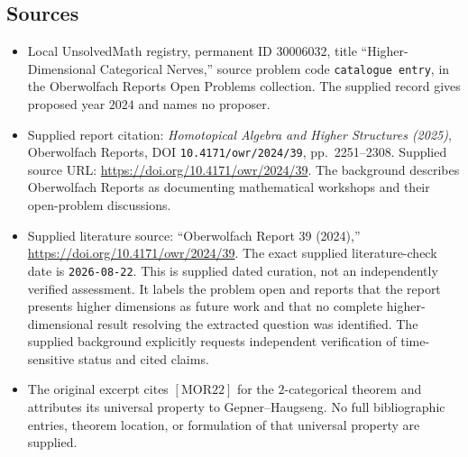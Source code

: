 \documentclass[11pt]{article}
\begin{document}
\subsection{Sources}
\begin{itemize}
\item Local UnsolvedMath registry, permanent ID \(30006032\), title ``Higher-Dimensional Categorical Nerves,'' source problem code \texttt{catalogue entry}, in the Oberwolfach Reports Open Problems collection. The supplied record gives proposed year \(2024\) and names no proposer.
\item Supplied report citation: \emph{Homotopical Algebra and Higher Structures (2025)}, Oberwolfach Reports, DOI \texttt{10.4171/owr/2024/39}, pp.~2251--2308. Supplied source URL: \url{https://doi.org/10.4171/owr/2024/39}. The background describes Oberwolfach Reports as documenting mathematical workshops and their open-problem discussions.
\item Supplied literature source: ``Oberwolfach Report 39 (2024),'' \url{https://doi.org/10.4171/owr/2024/39}. The exact supplied literature-check date is \texttt{2026-08-22}. This is supplied dated curation, not an independently verified assessment. It labels the problem open and reports that the report presents higher dimensions as future work and that no complete higher-dimensional result resolving the extracted question was identified. The supplied background explicitly requests independent verification of time-sensitive status and cited claims.
\item The original excerpt cites \([\mathrm{MOR22}]\) for the \(2\)-categorical theorem and attributes its universal property to Gepner--Haugseng. No full bibliographic entries, theorem location, or formulation of that universal property are supplied.
\end{itemize}
\end{document}
